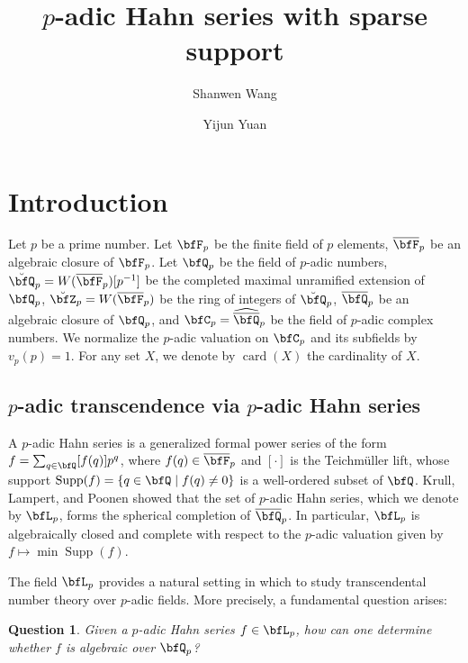 \documentclass[english,oneside]{smfart}
\title{$p$-adic Hahn series with sparse support}
\author{Shanwen Wang\orcidlink{0000-0003-0228-1208}}
\author{Yijun Yuan\orcidlink{0000-0001-6571-6980}}
\newcommand{\opn}[1]{\operatorname{#1}}
\newtheorem{question}[theorem]{Question}
\begin{document}
\def\ttsize{\footnotesize}
\maketitle
\tableofcontents
\section{Introduction}
Let $p$ be a prime number. Let $\bfF_p$ be the finite field of $p$ elements, $\overline{\bfF}_p$ be an algebraic closure of $\bfF_p$. Let $\bfQ_p$ be the field of $p$-adic numbers, $\breve{\bfQ}_p=W(\overline{\bfF}_p)[p^{-1}]$ be the completed maximal unramified extension of $\bfQ_p$, $\breve{\bfZ}_p=W(\overline{\bfF}_p)$ be the ring of integers of $\breve{\bfQ}_p$, $\overline{\bfQ}_p$ be an algebraic closure of $\bfQ_p$, and $\bfC_p=\widehat{\overline{\bfQ}}_p$ be the field of $p$-adic complex numbers. We normalize the $p$-adic valuation on $\bfC_p$ and its subfields by $v_p(p)=1$. For any set $X$, we denote by $\opn{card}(X)$ the cardinality of $X$.

\subsection{$p$-adic transcendence via $p$-adic Hahn series}
A $p$-adic Hahn series is a generalized formal power series of the form $f=\sum_{q\in\bfQ}[f(q)]p^q$, where $f(q)\in\overline{\bfF}_p$ and $[\cdot]$ is the Teichmüller lift, whose support $\opn{Supp}(f)=\{q\in\bfQ\mid f(q)\neq 0\}$ is a well-ordered subset of $\bfQ$. Krull, Lampert, and Poonen showed that the set of $p$-adic Hahn series, which we denote by $\bfL_p$, forms the spherical completion of $\overline{\bfQ}_p$. In particular, $\bfL_p$ is algebraically closed and complete with respect to the $p$-adic valuation given by $f\mapsto \min\opn{Supp}(f)$.

The field $\bfL_p$ provides a natural setting in which to study transcendental number theory over $p$-adic fields. More precisely, a fundamental question arises:
\begin{question}
    Given a $p$-adic Hahn series $f\in\bfL_p$, how can one determine whether $f$ is algebraic over $\bfQ_p$?
\end{question}
\end{document}
